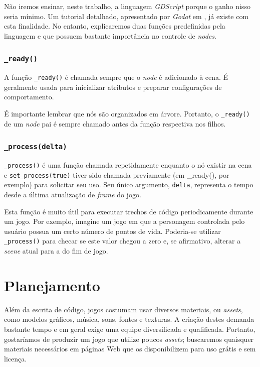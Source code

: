 Não iremos ensinar, neste trabalho, a linguagem \textit{GDScript} porque o ganho nisso seria mínimo. Um tutorial detalhado, apresentado por \textit{Godot} em \citep{godotGDScriptTutorial}, já existe com esta finalidade. No entanto, explicaremos duas funções predefinidas pela linguagem e que possuem bastante importância no controle de \textit{nodes}.

\subsubsection{\texttt{\_ready()}}

A função \texttt{\_ready()} é chamada sempre que o \textit{node} é adicionado à cena. É geralmente usada para inicializar atributos e preparar configurações de comportamento.

É importante lembrar que nós são organizados em árvore. Portanto, o \texttt{\_ready()} de um \textit{node} pai é sempre chamado antes da função respectiva nos filhos.

\subsubsection{\texttt{\_process(delta)}}

\texttt{\_process()} é uma função chamada repetidamente enquanto o nó existir na cena e \texttt{set\_process(true)} tiver sido chamada previamente (em \_ready(), por exemplo) para solicitar seu uso. Seu único argumento, \texttt{delta}, representa o tempo desde a última atualização de \textit{frame} do jogo.

Esta função é muito útil para executar trechos de código periodicamente durante um jogo. Por exemplo, imagine um jogo em que a personagem controlada pelo usuário possua um certo número de pontos de vida. Poderia-se utilizar \texttt{\_process()} para checar se este valor chegou a zero e, se afirmativo, alterar a \textit{scene} atual para a do fim de jogo.


\section{Planejamento}

Além da escrita de código, jogos costumam usar diversos materiais, ou \emph{assets}, como modelos gráficos, música, sons, fontes e texturas. A criação destes demanda bastante tempo e em geral exige uma equipe diversificada e qualificada. Portanto, gostaríamos de produzir um jogo que utilize poucos \textit{assets}; buscaremos quaisquer materiais necessários em páginas Web que os disponibilizem para uso grátis e sem licença.

